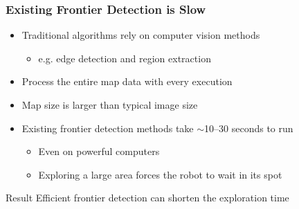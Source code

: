 \begin{frame}
\frametitle{Existing Frontier Detection is Slow}
\begin{itemize}
  \item Traditional algorithms rely on computer vision methods 
  \begin{itemize}
    \item e.g. edge detection and region extraction
  \end{itemize}
  
  \item Process the entire map data with every execution \pause
  \item Map size is larger than typical image size 
  \item Existing frontier detection methods take $\sim$10--30 seconds to run
  	\begin{itemize}
  	  \item Even on powerful computers 
  	  \item Exploring a large area forces the robot to wait in its spot 
  	\end{itemize} 
  
  
  \pause
\end{itemize}
\begin{block}{Result}
	\center Efficient frontier detection can shorten the exploration time
\end{block}
 
\end{frame}

